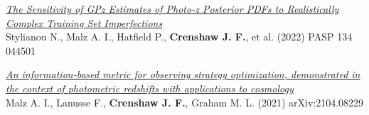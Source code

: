 \begin{etaremune}
\item \href{https://ui.adsabs.harvard.edu/abs/2022PASP..134d4501S}{\textit{The Sensitivity of GPz Estimates of Photo-z Posterior PDFs to Realistically Complex Training Set Imperfections}} \\ 
Stylianou N., Malz A. I., Hatfield P., \textbf{Crenshaw J. F.}, et al. (2022) 
PASP 134 044501 

\item \href{https://ui.adsabs.harvard.edu/abs/2021arXiv210408229M}{\textit{An information-based metric for observing strategy optimization, demonstrated in the context of photometric redshifts with applications to cosmology}} \\ 
Malz A. I., Lanusse F., \textbf{Crenshaw J. F.}, Graham M. L. (2021) 
arXiv:2104.08229 

\end{etaremune}



